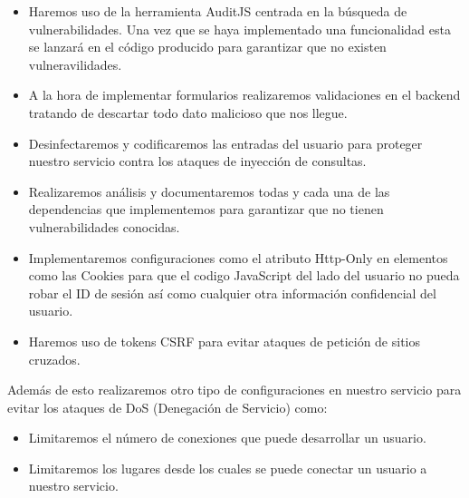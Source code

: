 \begin{itemize}

    \item Haremos uso de la herramienta AuditJS centrada en la búsqueda de vulnerabilidades. Una vez que se haya implementado una funcionalidad esta se lanzará en el código producido para garantizar que no existen vulneravilidades.
    \item A la hora de implementar formularios realizaremos validaciones en el backend tratando de descartar todo dato malicioso que nos llegue.
    \item Desinfectaremos y codificaremos las entradas del usuario para proteger nuestro servicio contra los ataques de inyección de consultas.
    \item Realizaremos análisis y documentaremos todas y cada una de las dependencias que implementemos para garantizar que no tienen vulnerabilidades conocidas.
    \item Implementaremos configuraciones como el atributo Http-Only en elementos como las Cookies para que el codigo JavaScript del lado del usuario no pueda robar el ID de sesión así como cualquier otra información confidencial del usuario.
    \item Haremos uso de tokens CSRF para evitar ataques de petición de sitios cruzados.    
    
\end{itemize}

Además de esto realizaremos otro tipo de configuraciones en nuestro servicio para evitar los ataques de DoS (Denegación de Servicio) como:

\begin{itemize}

    \item Limitaremos el número de conexiones que puede desarrollar un usuario.
    \item Limitaremos los lugares desde los cuales se puede conectar un usuario a nuestro servicio.

\end{itemize}
